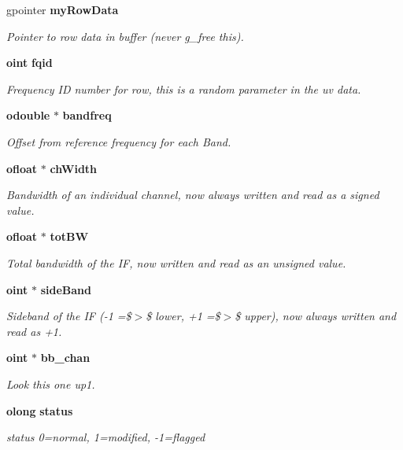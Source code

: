 \begin{CompactItemize}
gpointer {\bf my\-Row\-Data}
\begin{CompactList}\small\item\em Pointer to row data in buffer (never g\_\-free this). \item\end{CompactList}\item 
{\bf oint} {\bf fqid}
\begin{CompactList}\small\item\em Frequency ID number for row, this is a random parameter in the uv data. \item\end{CompactList}\item 
{\bf odouble} $\ast$ {\bf bandfreq}
\begin{CompactList}\small\item\em Offset from reference frequency for each Band. \item\end{CompactList}\item 
{\bf ofloat} $\ast$ {\bf ch\-Width}
\begin{CompactList}\small\item\em Bandwidth of an individual channel, now always written and read as a signed value. \item\end{CompactList}\item 
{\bf ofloat} $\ast$ {\bf tot\-BW}
\begin{CompactList}\small\item\em Total bandwidth of the IF, now written and read as an unsigned value. \item\end{CompactList}\item 
{\bf oint} $\ast$ {\bf side\-Band}
\begin{CompactList}\small\item\em Sideband of the IF (-1 =\$$>$\$ lower, +1 =\$$>$\$ upper), now always written and read as +1. \item\end{CompactList}\item 
{\bf oint} $\ast$ {\bf bb\_\-chan}
\begin{CompactList}\small\item\em Look this one up1. \item\end{CompactList}\item 
{\bf olong} {\bf status}
\begin{CompactList}\small\item\em status 0=normal, 1=modified, -1=flagged \item\end{CompactList}\end{CompactItemize}


